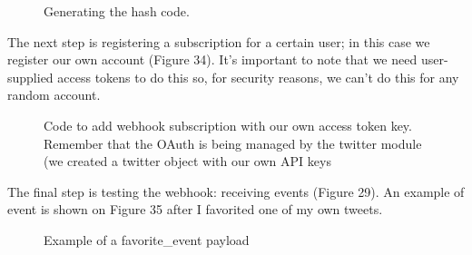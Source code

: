 \documentclass[12pt]{article} %
\begin{document}
\begin{enumerate}
		\begin{figure}[H] %
		\caption{Generating the hash code.}
		\label{hashCreation}
		\end{figure}

		The next step is registering a subscription for a certain user; in this case we register our own account (Figure 34). It's important to note that 
		we need user-supplied access tokens to do this so, for security reasons, we can't do this for any random account. 

		\begin{figure}[H] %
		\caption{Code to add webhook subscription with our own access token key. Remember that the OAuth is being managed by the twitter module (we created a twitter object 				with our own API keys}
		\label{addWebhookSubscription}
		\end{figure}

		The final step is testing the webhook: receiving events (Figure 29). An example of event is shown on Figure 35 after I favorited one of my own tweets.

		\begin{figure}[H] %
		\caption{Example of a favorite\_event payload}
		\label{favoriteEventExample}
		\end{figure}


\end{enumerate}
\end{document}
